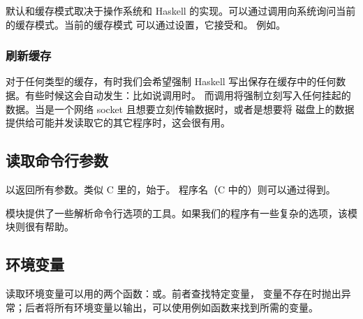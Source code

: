 \documentclass[./main.tex]{subfiles}
\begin{document}
默认和缓存模式取决于操作系统和 Haskell 的实现。可以通过调用向系统询问当前的缓存模式。当前的缓存模式
可以通过设置，它接受和。
例如。

\subsubsection*{刷新缓存}

对于任何类型的缓存，有时我们会希望强制 Haskell 写出保存在缓存中的任何数据。有些时候这会自动发生：比如说调用时。
而调用将强制立刻写入任何挂起的数据。当是一个网络 socket 且想要立刻传输数据时，或者是想要将
磁盘上的数据提供给可能并发读取它的其它程序时，这会很有用。

\subsection*{读取命令行参数}

以返回所有参数。类似 C 里的，始于。
程序名（C 中的）则可以通过得到。

模块提供了一些解析命令行选项的工具。如果我们的程序有一些复杂的选项，该模块则很有帮助。

\subsection*{环境变量}

读取环境变量可以用的两个函数：或。前者查找特定变量，
变量不存在时抛出异常；后者将所有环境变量以输出，可以使用例如函数来找到所需的变量。
\end{document}
